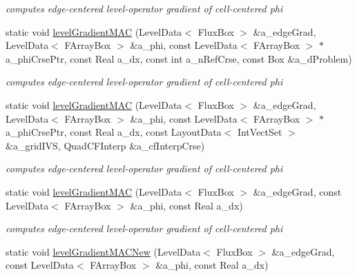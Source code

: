 \begin{DoxyCompactItemize}
\begin{DoxyCompactList}\small\item\em computes edge-\/centered level-\/operator gradient of cell-\/centered phi \end{DoxyCompactList}\item 
static void \hyperlink{class_gradient_a984db420418480a063fa7e60dc18144d}{level\-Gradient\-M\-A\-C} (Level\-Data$<$ Flux\-Box $>$ \&a\-\_\-edge\-Grad, Level\-Data$<$ F\-Array\-Box $>$ \&a\-\_\-phi, const Level\-Data$<$ F\-Array\-Box $>$ $\ast$a\-\_\-phi\-Crse\-Ptr, const Real a\-\_\-dx, const int a\-\_\-n\-Ref\-Crse, const Box \&a\-\_\-d\-Problem)
\begin{DoxyCompactList}\small\item\em computes edge-\/centered level-\/operator gradient of cell-\/centered phi \end{DoxyCompactList}\item 
static void \hyperlink{class_gradient_a1e5777612a7ff994896d694e2c1c816b}{level\-Gradient\-M\-A\-C} (Level\-Data$<$ Flux\-Box $>$ \&a\-\_\-edge\-Grad, Level\-Data$<$ F\-Array\-Box $>$ \&a\-\_\-phi, const Level\-Data$<$ F\-Array\-Box $>$ $\ast$a\-\_\-phi\-Crse\-Ptr, const Real a\-\_\-dx, const Layout\-Data$<$ Int\-Vect\-Set $>$ \&a\-\_\-grid\-I\-V\-S, Quad\-C\-F\-Interp \&a\-\_\-cf\-Interp\-Crse)
\begin{DoxyCompactList}\small\item\em computes edge-\/centered level-\/operator gradient of cell-\/centered phi \end{DoxyCompactList}\item 
static void \hyperlink{class_gradient_a3d95193c15462219bd5159de5341b291}{level\-Gradient\-M\-A\-C} (Level\-Data$<$ Flux\-Box $>$ \&a\-\_\-edge\-Grad, const Level\-Data$<$ F\-Array\-Box $>$ \&a\-\_\-phi, const Real a\-\_\-dx)
\begin{DoxyCompactList}\small\item\em computes edge-\/centered level-\/operator gradient of cell-\/centered phi \end{DoxyCompactList}\item 
\hypertarget{class_gradient_a9346502d05a030c51820bc034816d898}{static void \hyperlink{class_gradient_a9346502d05a030c51820bc034816d898}{level\-Gradient\-M\-A\-C\-New} (Level\-Data$<$ Flux\-Box $>$ \&a\-\_\-edge\-Grad, const Level\-Data$<$ F\-Array\-Box $>$ \&a\-\_\-phi, const Real a\-\_\-dx)}\label{class_gradient_a9346502d05a030c51820bc034816d898}


\end{DoxyCompactItemize}
